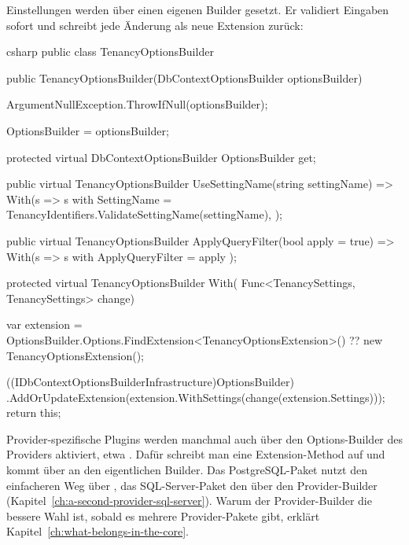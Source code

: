 Einstellungen werden über einen eigenen Builder gesetzt. Er validiert Eingaben sofort und
schreibt jede Änderung als neue Extension zurück:

\begin{sourcecode}{csharp}
public class TenancyOptionsBuilder
{
    public TenancyOptionsBuilder(DbContextOptionsBuilder optionsBuilder)
    {
        ArgumentNullException.ThrowIfNull(optionsBuilder);

        OptionsBuilder = optionsBuilder;
    }

    protected virtual DbContextOptionsBuilder OptionsBuilder { get; }

    public virtual TenancyOptionsBuilder UseSettingName(string settingName)
        => With(s => s with
        {
            SettingName = TenancyIdentifiers.ValidateSettingName(settingName),
        });

    public virtual TenancyOptionsBuilder ApplyQueryFilter(bool apply = true)
        => With(s => s with { ApplyQueryFilter = apply });

    protected virtual TenancyOptionsBuilder With(
        Func<TenancySettings, TenancySettings> change)
    {
        var extension = OptionsBuilder.Options.FindExtension<TenancyOptionsExtension>()
                        ?? new TenancyOptionsExtension();

        ((IDbContextOptionsBuilderInfrastructure)OptionsBuilder)
            .AddOrUpdateExtension(extension.WithSettings(change(extension.Settings)));
        return this;
    }
}
\end{sourcecode}

\begin{note}
  Provider-spezifische Plugins werden manchmal auch über den Options-Builder des Providers
  aktiviert, etwa . Dafür schreibt man
  eine Extension-Method auf
  und kommt über
  an den eigentlichen Builder. Das PostgreSQL-Paket nutzt den einfacheren Weg über
  , das SQL-Server-Paket
  den über den Provider-Builder (Kapitel~\ref{ch:a-second-provider-sql-server}). Warum
  der Provider-Builder die bessere Wahl ist, sobald es mehrere Provider-Pakete gibt, erklärt
  Kapitel~\ref{ch:what-belongs-in-the-core}.
\end{note}

